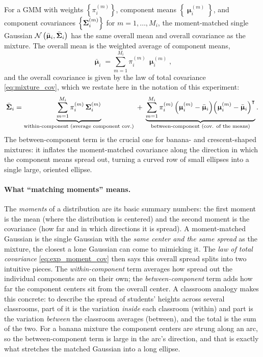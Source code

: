 \documentclass[11pt, letterpaper]{article}
\newcommand{\bSigma}{\vb{\Sigma}}
\newcommand{\bmu}{\boldsymbol{\upmu}}
\newcommand{\Norm}{\mathcal{N}}
\begin{document}
For a GMM with weights $\left\{\pi_i^{(m)}\right\}$, component means $\left\{\bmu_i^{(m)}\right\}$, and component covariances $\left\{\bSigma_i^{(m)}\right\}$ for $m = 1, \ldots, M_i$, the moment-matched single Gaussian $\Norm\left(\bar{\bmu}_i, \bar{\bSigma}_i\right)$ has the same overall mean and overall covariance as the mixture. The overall mean is the weighted average of component means,
\begin{equation}\label{eq:exp_moment_mean}
    \bar{\bmu}_i = \sum_{m=1}^{M_i} \pi_i^{(m)}\, \bmu_i^{(m)},
\end{equation}
and the overall covariance is given by the law of total covariance \cref{eq:mixture_cov}, which we restate here in the notation of this experiment:
\begin{equation}\label{eq:exp_moment_cov}
    \bar{\bSigma}_i = \underbrace{\sum_{m=1}^{M_i} \pi_i^{(m)}\, \bSigma_i^{(m)}}_{\text{within-component (average component cov.)}} \;+\; \underbrace{\sum_{m=1}^{M_i} \pi_i^{(m)}\left(\bmu_i^{(m)} - \bar{\bmu}_i\right)\!\left(\bmu_i^{(m)} - \bar{\bmu}_i\right)^{\intercal}}_{\text{between-component (cov. of the means)}}.
\end{equation}
The between-component term is the crucial one for banana- and crescent-shaped mixtures: it inflates the moment-matched covariance along the direction in which the component means spread out, turning a curved row of small ellipses into a single large, oriented ellipse.

\paragraph{What ``matching moments'' means.} The \emph{moments} of a distribution are its basic summary numbers: the first moment is the mean (where the distribution is centered) and the second moment is the covariance (how far and in which directions it is spread). A moment-matched Gaussian is the single Gaussian with the \emph{same center and the same spread} as the mixture, the closest a lone Gaussian can come to mimicking it. The \emph{law of total covariance} \cref{eq:exp_moment_cov} then says this overall spread splits into two intuitive pieces. The \emph{within-component} term averages how spread out the individual components are on their own; the \emph{between-component} term adds how far the component centers sit from the overall center. A classroom analogy makes this concrete: to describe the spread of students' heights across several classrooms, part of it is the variation \emph{inside} each classroom (within) and part is the variation \emph{between} the classroom averages (between), and the total is the sum of the two. For a banana mixture the component centers are strung along an arc, so the between-component term is large in the arc's direction, and that is exactly what stretches the matched Gaussian into a long ellipse.
\end{document}
